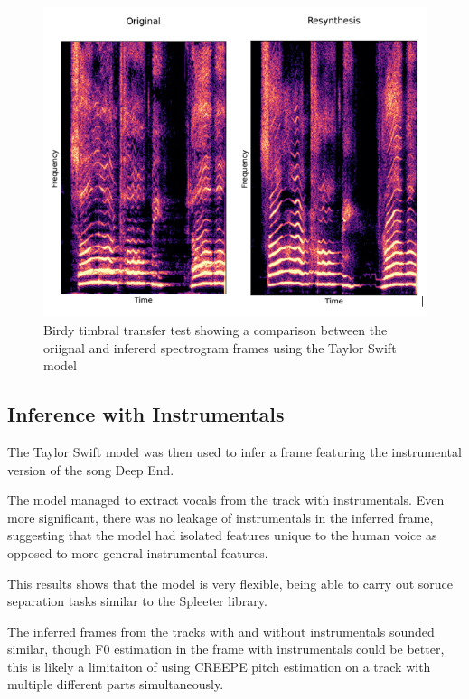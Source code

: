 \begin{figure}[H]
    \centering
    \includegraphics[width=\textwidth]{research/results/Birdy/TimbralTransfer.png}
    \caption{Birdy timbral transfer test showing a comparison between the oriignal and infererd spectrogram frames using the Taylor Swift model}
\end{figure}

\subsection{Inference with Instrumentals}

The Taylor Swift model was then used to infer a frame featuring the instrumental version of the song Deep End.

The model managed to extract vocals from the track with instrumentals. Even more significant, there was no leakage of instrumentals in the inferred frame, suggesting that the model had isolated features unique to the human voice as opposed to more general instrumental features.

This results shows that the model is very flexible, being able to carry out soruce separation tasks similar to the Spleeter library\cite{Spleeter}.

The inferred frames from the tracks with and without instrumentals sounded similar, though F0 estimation in the frame with instrumentals could be better, this is likely a limitaiton of using CREEPE pitch estimation on a track with multiple different parts simultaneously.


